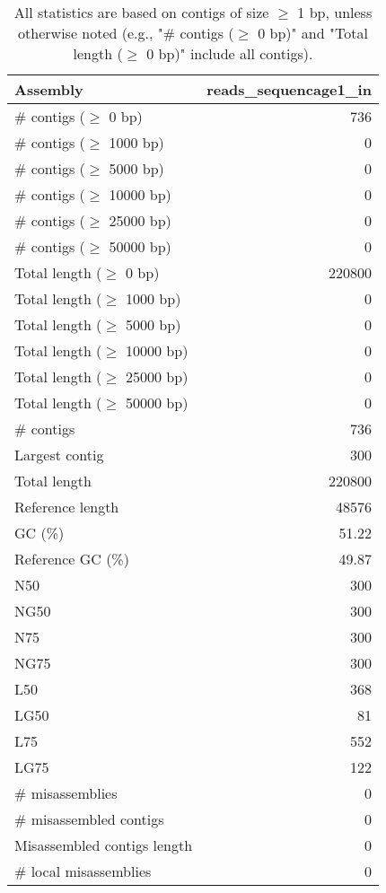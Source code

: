 \documentclass[12pt,a4paper]{article}
\begin{document}
\begin{table}[ht]
\begin{center}
\caption{All statistics are based on contigs of size $\geq$ 1 bp, unless otherwise noted (e.g., "\# contigs ($\geq$ 0 bp)" and "Total length ($\geq$ 0 bp)" include all contigs).}
\begin{tabular}{|l*{1}{|r}|}
\hline
Assembly & reads\_sequencage1\_in \\ \hline
\# contigs ($\geq$ 0 bp) & 736 \\ \hline
\# contigs ($\geq$ 1000 bp) & 0 \\ \hline
\# contigs ($\geq$ 5000 bp) & 0 \\ \hline
\# contigs ($\geq$ 10000 bp) & 0 \\ \hline
\# contigs ($\geq$ 25000 bp) & 0 \\ \hline
\# contigs ($\geq$ 50000 bp) & 0 \\ \hline
Total length ($\geq$ 0 bp) & 220800 \\ \hline
Total length ($\geq$ 1000 bp) & 0 \\ \hline
Total length ($\geq$ 5000 bp) & 0 \\ \hline
Total length ($\geq$ 10000 bp) & 0 \\ \hline
Total length ($\geq$ 25000 bp) & 0 \\ \hline
Total length ($\geq$ 50000 bp) & 0 \\ \hline
\# contigs & 736 \\ \hline
Largest contig & 300 \\ \hline
Total length & 220800 \\ \hline
Reference length & 48576 \\ \hline
GC (\%) & 51.22 \\ \hline
Reference GC (\%) & 49.87 \\ \hline
N50 & 300 \\ \hline
NG50 & 300 \\ \hline
N75 & 300 \\ \hline
NG75 & 300 \\ \hline
L50 & 368 \\ \hline
LG50 & 81 \\ \hline
L75 & 552 \\ \hline
LG75 & 122 \\ \hline
\# misassemblies & 0 \\ \hline
\# misassembled contigs & 0 \\ \hline
Misassembled contigs length & 0 \\ \hline
\# local misassemblies & 0 \\ \hline

\end{tabular}
\end{center}
\end{table}
\end{document}
